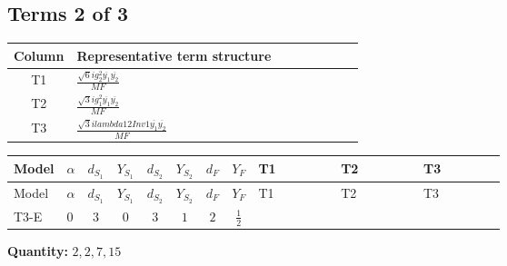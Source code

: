 \documentclass[8pt]{article}
\begin{document}
\begin{landscape}
\subsection*{Terms 2 of 3}
\begin{center}
\begin{tabular}{@{}c >{\raggedright\arraybackslash}p{0.82\linewidth}@{}}
\toprule
Column & Representative term structure \\
\midrule
T1 & \(\displaystyle \frac{\sqrt{6} i g_{2}^{2} \overline{y_{1}} \overline{y_{2}}}{MF}\) \\
\midrule
T2 & \(\displaystyle \frac{\sqrt{3} i g_{1}^{2} \overline{y_{1}} \overline{y_{2}}}{MF}\) \\
\midrule
T3 & \(\displaystyle \frac{\sqrt{3} i lambda12Inv1 \overline{y_{1}} \overline{y_{2}}}{MF}\) \\
\midrule
\bottomrule
\end{tabular}
\end{center}
\smallskip
\tiny
\begin{longtable}{@{}llcccccc >{\raggedright\arraybackslash}p{0.21\linewidth} >{\raggedright\arraybackslash}p{0.21\linewidth} >{\raggedright\arraybackslash}p{0.21\linewidth}@{}}
\toprule
Model & $\alpha$ & $d_{S_1}$ & $Y_{S_1}$ & $d_{S_2}$ & $Y_{S_2}$ & $d_F$ & $Y_F$ & T1 & T2 & T3 \\
\midrule
\endfirsthead
\toprule
Model & $\alpha$ & $d_{S_1}$ & $Y_{S_1}$ & $d_{S_2}$ & $Y_{S_2}$ & $d_F$ & $Y_F$ & T1 & T2 & T3 \\
\midrule
\endhead
T3-E & $0$ & $3$ & $0$ & $3$ & $1$ & $2$ & $\frac{1}{2}$ & \scriptsize\adjustbox{max width=\linewidth}{$\begin{gathered} - \frac{\sqrt{6} i g_{2}^{2} \overline{y_{1}} \overline{y_{2}}}{3 MF}\end{gathered}$} & \scriptsize\adjustbox{max width=\linewidth}{$\begin{gathered} - \frac{\sqrt{3} i g_{1}^{2} \overline{y_{1}} \overline{y_{2}}}{8 MF}\end{gathered}$} & \scriptsize\adjustbox{max width=\linewidth}{$\begin{gathered} \frac{\sqrt{3} i lambda12Inv1 \overline{y_{1}} \overline{y_{2}}}{6 MF}\end{gathered}$} \\
\midrule
\bottomrule
\end{longtable}
\clearpage
\noindent\textbf{Quantity: }$\mathrm{2,2,7,15}$\par\smallskip

\end{landscape}
\end{document}
